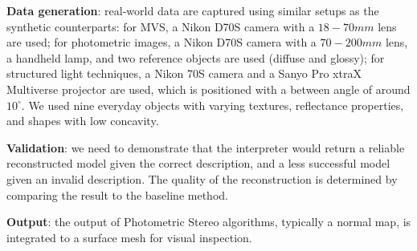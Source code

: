 \noindent\textbf{Data generation}: real-world data are captured using similar setups as the synthetic counterparts: for MVS, a Nikon D70S camera with a $18-70mm$ lens are used; for photometric images, a Nikon D70S camera with a $70-200mm$ lens, a handheld lamp, and two reference objects are used (diffuse and glossy); for structured light techniques, a Nikon 70S camera and a Sanyo Pro xtraX Multiverse projector are used, which is positioned with a between angle of around $10^\circ$. We used nine everyday objects with varying textures, reflectance properties, and shapes with low concavity.

\noindent\textbf{Validation}: we need to demonstrate that the interpreter would return a reliable reconstructed model given the correct description, and a less successful model given an invalid description. The quality of the reconstruction is determined by comparing the result to the baseline method.

\noindent\textbf{Output}: the output of Photometric Stereo algorithms, typically a normal map, is integrated to a surface mesh for visual inspection.




